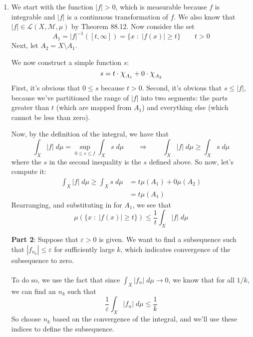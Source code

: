 \documentclass[12pt]{article}
\theoremstyle{plain}
\theoremstyle{definition}
\theoremstyle{remark}
\newcommand*{\Chi}{\mbox{\large$\chi$}} %
\begin{document}
\begin{enumerate}
\begin{enumerate}
\end{enumerate}



\newpage
\item We start with the function $|f|>0$, which is measurable because $f$ is integrable and $|f|$ is a continuous transformation of $f$. We also know that $|f|\in\mathscr{L}(X,\mathscr{M},\mu)$ by Theorem 88.12. Now consider the set
\[
    A_1 = |f|^{-1}([t,\infty]) = \{x \;:\; |f(x)|\geq t\}
    \qquad t>0
\]
Next, let $A_2 = X\setminus A_1$. 

We now construct a simple function $s$:
\[
    s = t\cdot \Chi_{A_1} + 0 \cdot \Chi_{A_2}
\]
First, it's obvious that $0\leq s$ because $t>0$. Second, it's obvious that $s\leq |f|$, because we've partitioned the range of $|f|$ into two segments: the parts greater than $t$ (which are mapped from $A_1$) and everything else (which cannot be less than zero).

Now, by the definition of the integral, we have that 
\[
    \int_X |f| \; d\mu = \sup_{0\leq s \leq f} \int_X s\;d\mu
    \qquad\Rightarrow\qquad
    \int_X |f| \; d\mu \geq \int_X s\;d\mu
\]
where the $s$ in the second inequality is the $s$ defined above. So now, let's compute it:
\begin{align*}
    \int_X |f| \; d\mu \geq \int_X s\;d\mu
    &= t \mu(A_1) + 0 \mu(A_2) \\
    &= t \mu(A_1) 
\end{align*}
Rearranging, and substituting in for $A_1$, we see that
\begin{equation}
    \mu\left(\{x \;:\; |f(x)|\geq t\}\right) \leq
    \frac{1}{t}\int_X |f| \; d\mu 
\end{equation}

{\textbf{Part 2}}: Suppose that $\varepsilon>0$ is given. We want to find a subsequence such that $|f_{n_k}|\leq \varepsilon$ for sufficiently large $k$, which indicates convergence of the subsequence to zero.
\\
\\
To do so, we use the fact that since $\int_X |f_n| \; d\mu\rightarrow 0$, we know that for all $1/k$, we can find an $n_k$ such that 
\[
    \frac{1}{\varepsilon} \int_X |f_n| \; d\mu \leq \frac{1}{k}
\]
So choose $n_k$ based on the convergence of the integral, and we'll use these indices to define the subsequence. 


\end{enumerate}
\end{document}
